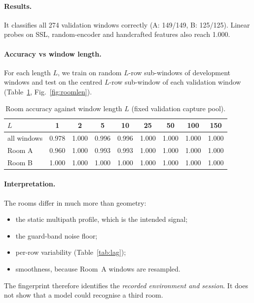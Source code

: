 \documentclass[11pt,a4paper]{article}
\begin{document}
\paragraph{Results.} It classifies all 274 validation windows correctly (A: 149/149, B: 125/125). Linear probes on SSL, random-encoder and handcrafted features also reach 1.000.

\paragraph{Accuracy vs window length.} For each length $L$, we train on random $L$-row sub-windows of development windows and test on the centred $L$-row sub-window of each validation window (Table~\ref{tab:len}, Fig.~\ref{fig:roomlen}).

\begin{table}[H]
\centering\small
\caption{Room accuracy against window length $L$ (fixed validation capture pool).}
\label{tab:len}
\begin{tabular}{lcccccccc}
\toprule
$L$ & 1 & 2 & 5 & 10 & 25 & 50 & 100 & 150\\
\midrule
all windows & 0.978 & 1.000 & 0.996 & 0.996 & 1.000 & 1.000 & 1.000 & 1.000\\
Room A & 0.960 & 1.000 & 0.993 & 0.993 & 1.000 & 1.000 & 1.000 & 1.000\\
Room B & 1.000 & 1.000 & 1.000 & 1.000 & 1.000 & 1.000 & 1.000 & 1.000\\
\bottomrule
\end{tabular}
\end{table}

\paragraph{Interpretation.} The rooms differ in much more than geometry:
\begin{itemize}
  \item the static multipath profile, which is the intended signal;
  \item the guard-band noise floor;
  \item per-row variability (Table~\ref{tab:lag});
  \item smoothness, because Room~A windows are resampled.
\end{itemize}
The fingerprint therefore identifies the \emph{recorded environment and session}. It does not show that a model could recognise a third room.

\end{document}
